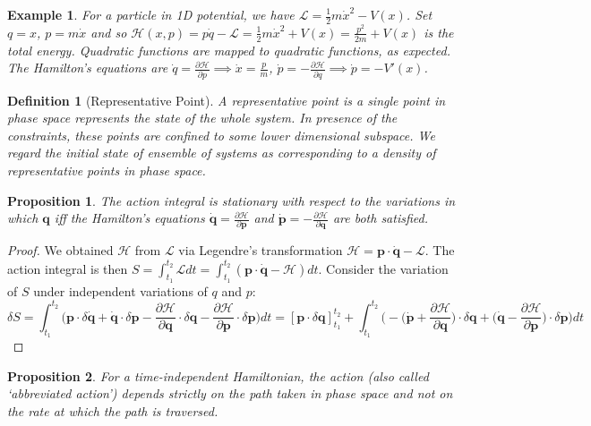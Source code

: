 \documentclass[a4paper]{article}
\newtheorem{defi}{Definition}[section]
\newtheorem{eg}{Example}[section]
\newtheorem{prop}{Proposition}[section]
\theoremstyle{new}
\begin{document}
\begin{eg}
For a particle in 1D potential, we have $\mathcal{L}=\frac{1}{2}m\dot{x}^2-V(x)$. Set $q=x$, $p=m\dot{x}$ and so $\mathcal{H}(x,p)=p\dot{q}-\mathcal{L}=\frac{1}{2}m\dot{x}^2+V(x)=\frac{p^2}{2m}+V(x)$ is the total energy. Quadratic functions are mapped to quadratic functions, as expected. The Hamilton's equations are $\dot{q}=\frac{\partial\mathcal{H}}{\partial p}\implies\dot{x}=\frac{p}{m}$, $\dot{p}=-\frac{\partial\mathcal{H}}{\partial q}\implies\dot{p}=-V'(x)$.
\end{eg}
\begin{defi}[Representative Point]
A representative point is a single point in phase space represents the state of the whole system. In presence of the constraints, these points are confined to some lower dimensional subspace. We regard the initial state of ensemble of systems as corresponding to a density of representative points in phase space.
\end{defi}
\begin{prop}
The action integral is stationary with respect to the variations in which $\mathbf{q}$ iff the Hamilton's equations $\mathbf{\dot{q}}=\frac{\partial\mathcal{H}}{\partial\mathbf{p}}$ and $\mathbf{\dot{p}}=-\frac{\partial\mathcal{H}}{\partial\mathbf{q}}$ are both satisfied.
\end{prop}
\begin{proof}
We obtained $\mathcal{H}$ from $\mathcal{L}$ via Legendre’s transformation $\mathcal{H}=\mathbf{p}\cdot\mathbf{\dot{q}}-\mathcal{L}$. The action integral is then $S=\int_{t_1}^{t_2}\mathcal{L}dt=\int_{t_1}^{t_2}(\mathbf{p}\cdot\mathbf{\dot{q}}-\mathcal{H})dt$. Consider the variation of $S$ under independent variations of $q$ and $p$:
$$\delta S=\int_{t_1}^{t_2}\bigg(\mathbf{p}\cdot\delta\mathbf{\dot{q}}+\mathbf{\dot{q}}\cdot\delta\mathbf{p}-\frac{\partial\mathcal{H}}{\partial\mathbf{q}}\cdot\delta\mathbf{q}-\frac{\partial\mathcal{H}}{\partial\mathbf{p}}\cdot\delta\mathbf{p}\bigg)dt=[\mathbf{p}\cdot\delta\mathbf{q}]_{t_1}^{t_2}+\int_{t_1}^{t_2}\bigg(-\bigg(\mathbf{\dot{p}}+\frac{\partial\mathcal{H}}{\partial\mathbf{q}}\bigg)\cdot\delta\mathbf{q}+\bigg(\mathbf{\dot{q}}-\frac{\partial\mathcal{H}}{\partial\mathbf{p}}\bigg)\cdot\delta\mathbf{p}\bigg)dt$$
\end{proof}
\begin{prop}
 For a time-independent Hamiltonian, the action (also called `abbreviated action') depends strictly on the path taken in phase space and not on the rate at which the path is traversed.
\end{prop}
\end{document}
